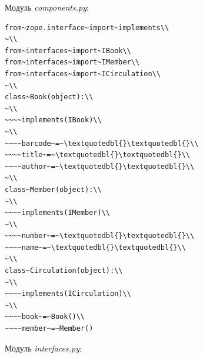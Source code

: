 \documentclass[a4paper,openany,twoside,draft]{book}
\providecommand*{\DUroletitlereference}[1]{\textsl{#1}}
\begin{document}
Модуль \DUroletitlereference{components.py}:

\begin{verbatim}
from~zope.interface~import~implements\\
~\\
from~interfaces~import~IBook\\
from~interfaces~import~IMember\\
from~interfaces~import~ICirculation\\
~\\
class~Book(object):\\
~\\
~~~~implements(IBook)\\
~\\
~~~~barcode~=~\textquotedbl{}\textquotedbl{}\\
~~~~title~=~\textquotedbl{}\textquotedbl{}\\
~~~~author~=~\textquotedbl{}\textquotedbl{}\\
~\\
class~Member(object):\\
~\\
~~~~implements(IMember)\\
~\\
~~~~number~=~\textquotedbl{}\textquotedbl{}\\
~~~~name~=~\textquotedbl{}\textquotedbl{}\\
~\\
class~Circulation(object):\\
~\\
~~~~implements(ICirculation)\\
~\\
~~~~book~=~Book()\\
~~~~member~=~Member()
\end{verbatim}

Модуль \DUroletitlereference{interfaces.py}:
\end{document}
